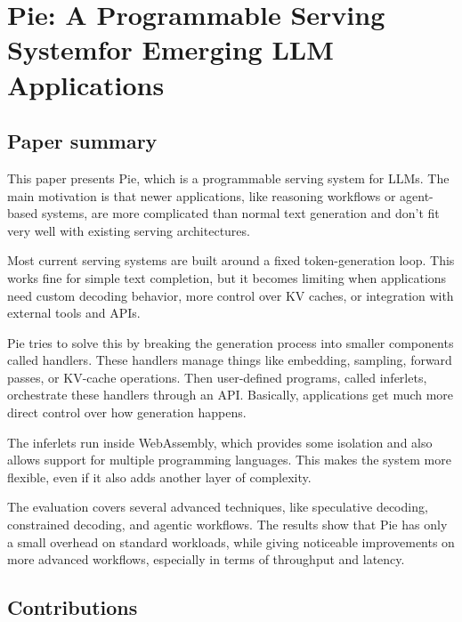 \documentclass[a4paper, 12pt]{article}
\begin{document}
\section*{Pie: A Programmable Serving Systemfor Emerging LLM Applications}
\subsection{Paper summary}

This paper presents Pie, which is a programmable serving system for LLMs. The main motivation is that newer applications, like reasoning workflows or agent-based systems, are more complicated than normal text generation and don’t fit very well with existing serving architectures.

Most current serving systems are built around a fixed token-generation loop. This works fine for simple text completion, but it becomes limiting when applications need custom decoding behavior, more control over KV caches, or integration with external tools and APIs.

Pie tries to solve this by breaking the generation process into smaller components called handlers. These handlers manage things like embedding, sampling, forward passes, or KV-cache operations. Then user-defined programs, called inferlets, orchestrate these handlers through an API. Basically, applications get much more direct control over how generation happens.

The inferlets run inside WebAssembly, which provides some isolation and also allows support for multiple programming languages. This makes the system more flexible, even if it also adds another layer of complexity.

The evaluation covers several advanced techniques, like speculative decoding, constrained decoding, and agentic workflows. The results show that Pie has only a small overhead on standard workloads, while giving noticeable improvements on more advanced workflows, especially in terms of throughput and latency.

\subsection{Contributions}
\end{document}
